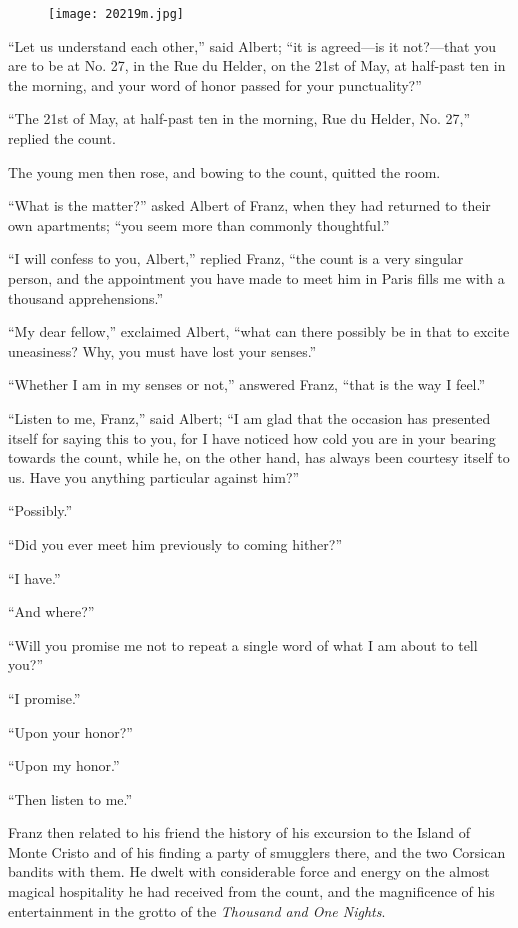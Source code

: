\begin{figure}[ht]
\texttt{[image: 20219m.jpg]}
\end{figure}

“Let us understand each other,” said Albert; “it is agreed—is it
not?—that you are to be at No. 27, in the Rue du Helder, on the 21st of
May, at half-past ten in the morning, and your word of honor passed for
your punctuality?”

“The 21st of May, at half-past ten in the morning, Rue du Helder, No.
27,” replied the count.

The young men then rose, and bowing to the count, quitted the room.

“What is the matter?” asked Albert of Franz, when they had returned to
their own apartments; “you seem more than commonly thoughtful.”

“I will confess to you, Albert,” replied Franz, “the count is a very
singular person, and the appointment you have made to meet him in Paris
fills me with a thousand apprehensions.”

“My dear fellow,” exclaimed Albert, “what can there possibly be in that
to excite uneasiness? Why, you must have lost your senses.”

“Whether I am in my senses or not,” answered Franz, “that is the way I
feel.”

“Listen to me, Franz,” said Albert; “I am glad that the occasion has
presented itself for saying this to you, for I have noticed how cold
you are in your bearing towards the count, while he, on the other hand,
has always been courtesy itself to us. Have you anything particular
against him?”

“Possibly.”

“Did you ever meet him previously to coming hither?”

“I have.”

“And where?”

“Will you promise me not to repeat a single word of what I am about to
tell you?”

“I promise.”

“Upon your honor?”

“Upon my honor.”

“Then listen to me.”

Franz then related to his friend the history of his excursion to the
Island of Monte Cristo and of his finding a party of smugglers there,
and the two Corsican bandits with them. He dwelt with considerable
force and energy on the almost magical hospitality he had received from
the count, and the magnificence of his entertainment in the grotto of
the \textit{Thousand and One Nights}.

